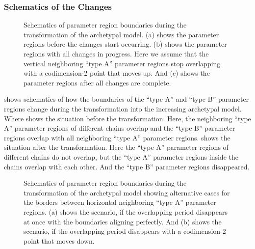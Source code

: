 \subsubsection{Schematics of the Changes}

\begin{figure}
	\centering
	\caption[Schematics of parameter region boundaries during the transformation of the archetypal model]{
		Schematics of parameter region boundaries during the transformation of the archetypal model.
		(a) shows the parameter regions before the changes start occurring.
		(b) shows the parameter regions with all changes in progress.
		Here we assume that the vertical neighboring ``type A'' parameter regions stop overlapping with a codimension-2 point that moves up.
		And (c) shows the parameter regions after all changes are complete.
	}
	\label{fig:add.change.schema}
\end{figure}

 shows schematics of how the boundaries of the ``type A'' and ``type B'' parameter regions change during the transformation into the increasing archetypal model.
Where  shows the situation before the transformation.
Here, the neighboring ``type A'' parameter regions of different chains overlap and the ``type B'' parameter regions overlap with all neighboring ``type A'' parameter regions.
 shows the situation after the transformation.
Here the ``type A'' parameter regions of different chains do not overlap, but the ``type A'' parameter regions inside the chains overlap with each other.
And the ``type B'' parameter regions disappeared.

\begin{figure}
	\centering
	\caption[Alternative schematics of parameter region boundaries during the transformation of the archetypal model]{
		Schematics of parameter region boundaries during the transformation of the archetypal model showing alternative cases for the borders between horizontal neighboring ``type A'' parameter regions.
		(a) shows the scenario, if the overlapping period disappears at once with the boundaries aligning perfectly.
		And (b) shows the scenario, if the overlapping period disappears with a codimension-2 point that moves down.
	}
	\label{fig:add.change.schema.during.alt}
\end{figure}

